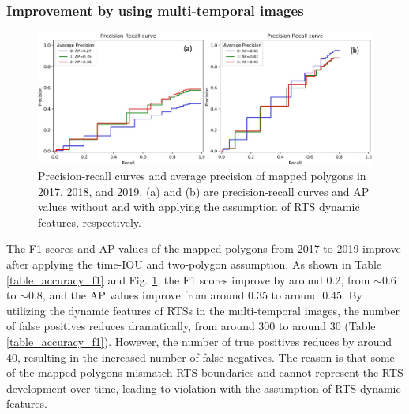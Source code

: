 \documentclass[authoryear,preprint,review,12pt]{elsarticle}
\begin{document}
\subsubsection{Improvement by using multi-temporal images}
\label{sec_improve_using_multi_images}

\begin{figure}
	\centering
	\includegraphics[width=14cm]{figs/exp14_p_r_curves_allPoly_trim.jpg}
	\caption{Precision-recall curves and average precision of mapped polygons in 2017, 2018, and 2019. (a) and (b) are precision-recall curves and AP values without and with applying the assumption of RTS dynamic features, respectively.}
	\label{fig_p_r_curve}
\end{figure}


The F1 scores and AP values of the mapped polygons from 2017 to 2019 improve after applying the time-IOU and two-polygon assumption. 
As shown in Table \ref{table_accuracy_f1} and Fig. \ref{fig_p_r_curve}, the F1 scores improve by around 0.2, from $\sim$0.6 to $\sim$0.8, and the AP values improve from around 0.35 to around 0.45. 
By utilizing the dynamic features of RTSs in the multi-temporal images, the number of false positives reduces dramatically, from around 300 to around 30 (Table \ref{table_accuracy_f1}).
However, the number of true positives reduces by around 40, resulting in the increased number of false negatives. 
The reason is that some of the mapped polygons mismatch RTS boundaries and cannot represent the RTS development over time, leading to violation with the assumption of RTS dynamic features. 
 
\end{document}
